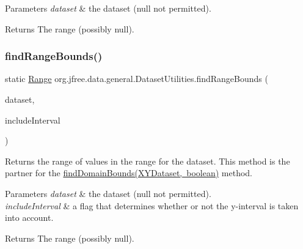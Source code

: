 \begin{DoxyParams}{Parameters}
{\em dataset} & the dataset ({\ttfamily null} not permitted).\\
\hline
\end{DoxyParams}
\begin{DoxyReturn}{Returns}
The range (possibly {\ttfamily null}). 
\end{DoxyReturn}
\mbox{\label{classorg_1_1jfree_1_1data_1_1general_1_1_dataset_utilities_ab8786c80dc8295cf2e52b972eb2b2cda}} 
\subsubsection{\texorpdfstring{find\+Range\+Bounds()}{findRangeBounds()}\hspace{0.1cm}{\footnotesize\ttfamily [5/6]}}
{\footnotesize\ttfamily static \mbox{\hyperlink{classorg_1_1jfree_1_1data_1_1_range}{Range}} org.\+jfree.\+data.\+general.\+Dataset\+Utilities.\+find\+Range\+Bounds (\begin{DoxyParamCaption}\item[{\mbox{\hyperlink{interfaceorg_1_1jfree_1_1data_1_1xy_1_1_x_y_dataset}{X\+Y\+Dataset}}}]{dataset,  }\item[{boolean}]{include\+Interval }\end{DoxyParamCaption})\hspace{0.3cm}{\ttfamily [static]}}

Returns the range of values in the range for the dataset. This method is the partner for the \mbox{\hyperlink{classorg_1_1jfree_1_1data_1_1general_1_1_dataset_utilities_a0841a95a5e3f28ef32ce8ff8366370dc}{find\+Domain\+Bounds(\+X\+Y\+Dataset, boolean)}} method.


\begin{DoxyParams}{Parameters}
{\em dataset} & the dataset ({\ttfamily null} not permitted). \\
\hline
{\em include\+Interval} & a flag that determines whether or not the y-\/interval is taken into account.\\
\hline
\end{DoxyParams}
\begin{DoxyReturn}{Returns}
The range (possibly {\ttfamily null}). 
\end{DoxyReturn}
\mbox{\label{classorg_1_1jfree_1_1data_1_1general_1_1_dataset_utilities_ac396df6e5ab7f6a3bc86dc6d81617030}} 
